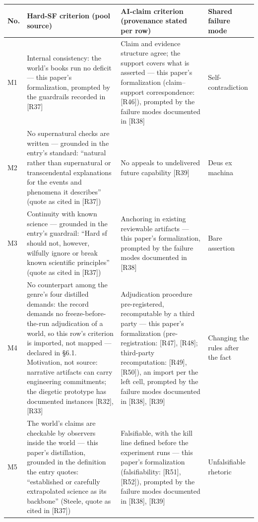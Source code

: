 \documentclass[11pt,a4paper]{article}
\begin{document}
\begin{table}[htbp]
\centering
\small
\setlength{\tabcolsep}{3.5pt}
\renewcommand{\arraystretch}{1.18}
\begin{tabularx}{0.985\textwidth}{@{}>{\raggedright\arraybackslash}p{}>{\raggedright\arraybackslash}X>{\raggedright\arraybackslash}X>{\raggedright\arraybackslash}p{}@{}}
\toprule
\textbf{No.} & \textbf{Hard-SF criterion (pool source)} & \textbf{AI-claim criterion (provenance stated per row)} & \textbf{Shared failure mode} \\
\midrule
M1 & Internal consistency: the world's books run no deficit — this paper's formalization, prompted by the guardrails recorded in [R37] & Claim and evidence structure agree; the support covers what is asserted — this paper's formalization (claim–support correspondence: [R46]), prompted by the failure modes documented in [R38] & Self-contradiction \\
M2 & No supernatural checks are written — grounded in the entry's standard: ``natural rather than supernatural or transcendental explanations for the events and phenomena it describes'' (quote as cited in [R37]) & No appeals to undelivered future capability [R39] & Deus ex machina \\
M3 & Continuity with known science — grounded in the entry's guardrail: ``Hard sf should not, however, wilfully ignore or break known scientific principles'' (quote as cited in [R37]) & Anchoring in existing reviewable artifacts — this paper's formalization, prompted by the failure modes documented in [R38] & Bare assertion \\
M4 & No counterpart among the genre's four distilled demands: the record demands no freeze-before-the-run adjudication of a world, so this row's criterion is imported, not mapped — declared in §6.1. Motivation, not source: narrative artifacts can carry engineering commitments; the diegetic prototype has documented instances [R32], [R33] & Adjudication procedure pre-registered, recomputable by a third party — this paper's formalization (pre-registration: [R47], [R48]; third-party recomputation: [R49], [R50]), an import per the left cell, prompted by the failure modes documented in [R38], [R39] & Changing the rules after the fact \\
M5 & The world's claims are checkable by observers inside the world — this paper's distillation, grounded in the definition the entry quotes: ``established or carefully extrapolated science as its backbone'' (Steele, quote as cited in [R37]) & Falsifiable, with the kill line defined before the experiment runs — this paper's formalization (falsifiability: [R51], [R52]), prompted by the failure modes documented in [R38], [R39] & Unfalsifiable rhetoric \\
\bottomrule
\end{tabularx}
\end{table}
\end{document}
